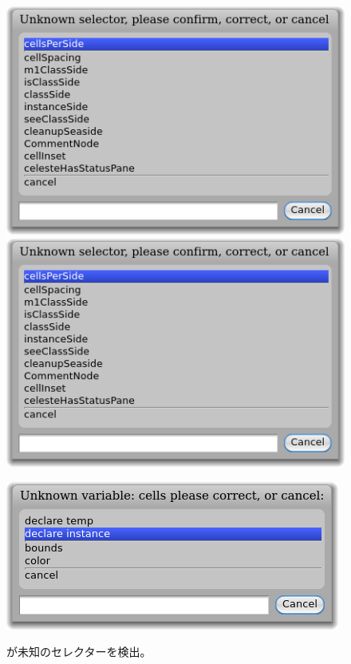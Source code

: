 \documentclass[a4paper,10pt,twoside]{book}
\begin{document}
\begin{figure}[htb]
\begin{minipage}{0.48\textwidth}
	\centering
	\ifluluelse
		{\includegraphics[width=\textwidth]{UnknownSelector}}
		{\includegraphics[scale=0.7]{UnknownSelector}}
	\caption{\pharo{}が未知のセレクターを検出。}
\end{minipage}
\hfill
\begin{minipage}{0.48\textwidth}
	\centering
	\ifluluelse
		{\includegraphics[width=\textwidth]{DeclareInstanceVar}}

\end{minipage}
\end{figure}
\end{document}
